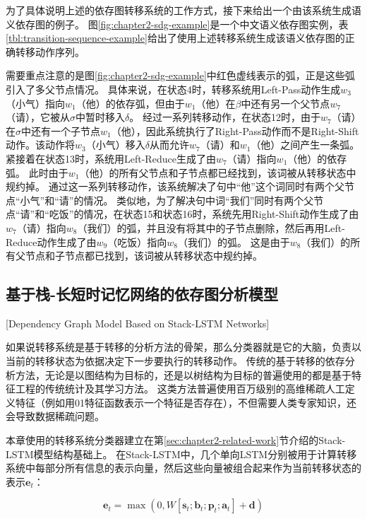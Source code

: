 为了具体说明上述的依存图转移系统的工作方式，接下来给出一个由该系统生成语义依存图的例子。
图\ref{fig:chapter2-sdg-example}是一个中文语义依存图实例，表\ref{tbl:transition-sequence-example}给出了使用上述转移系统生成该语义依存图的正确转移动作序列。

需要重点注意的是图\ref{fig:chapter2-sdg-example}中红色虚线表示的弧，正是这些弧引入了多父节点情况。
具体来说，在状态4时，转移系统用Left-Pass动作生成$w_3$（小气）指向$w_1$（他）的依存弧，但由于$w_1$（他）在$\beta$中还有另一个父节点$w_7$（请），它被从$\sigma$中暂时移入$\delta$。
经过一系列转移动作，在状态12时，由于$w_7$（请）在$\sigma$中还有一个子节点$w_1$（他），因此系统执行了Right-Pass动作而不是Right-Shift动作。该动作将$w_3$（小气）移入$\delta$从而允许$w_7$（请）和$w_1$（他）之间产生一条弧。
紧接着在状态13时，系统用Left-Reduce生成了由$w_7$（请）指向$w_1$（他）的依存弧。
此时由于$w_1$（他）的所有父节点和子节点都已经找到，该词被从转移状态中规约掉。
通过这一系列转移动作，该系统解决了句中“他”这个词同时有两个父节点“小气”和“请”的情况。
类似地，为了解决句中词“我们”同时有两个父节点“请”和“吃饭”的情况，在状态15和状态16时，系统先用Right-Shift动作生成了由$w_7$（请）指向$w_8$（我们）的弧，并且没有将其中的子节点删除，然后再用Left-Reduce动作生成了由$w_9$（吃饭）指向$w_8$（我们）的弧。
这是由于$w_8$（我们）的所有父节点和子节点都已找到，该词被从转移状态中规约掉。


\subsection{基于栈-长短时记忆网络的依存图分析模型}[Dependency Graph Model Based on Stack-LSTM Networks]

如果说转移系统是基于转移的分析方法的骨架，那么分类器就是它的大脑，负责以当前的转移状态为依据决定下一步要执行的转移动作。
传统的基于转移的依存分析方法，无论是以图结构为目标的\cite{sagae-tsujii-2008-shift,titov-etal-2009-online}，还是以树结构为目标的\cite{yamada-etal-2003-statistical,nivre-2004-incrementality}普遍使用的都是基于特征工程的传统统计及其学习方法。
这类方法普遍使用百万级别的高维稀疏人工定义特征（例如用01特征函数表示一个特征是否存在），不但需要人类专家知识，还会导致数据稀疏问题。

本章使用的转移系统分类器建立在第\ref{sec:chapter2-related-work}节介绍的Stack-LSTM模型结构基础上。
在Stack-LSTM中，几个单向LSTM分别被用于计算转移系统中每部分所有信息的表示向量，然后这些向量被组合起来作为当前转移状态的表示$\bm{e}_t$：

\vspace{-0.6em}
\begin{equation}
	\label{eq:trans}
	\bm{e}_t=\max(0,W[\bm{s}_t;\bm{b}_t; \bm{p}_t; \bm{a}_t ]+\bm{d})
\end{equation}

